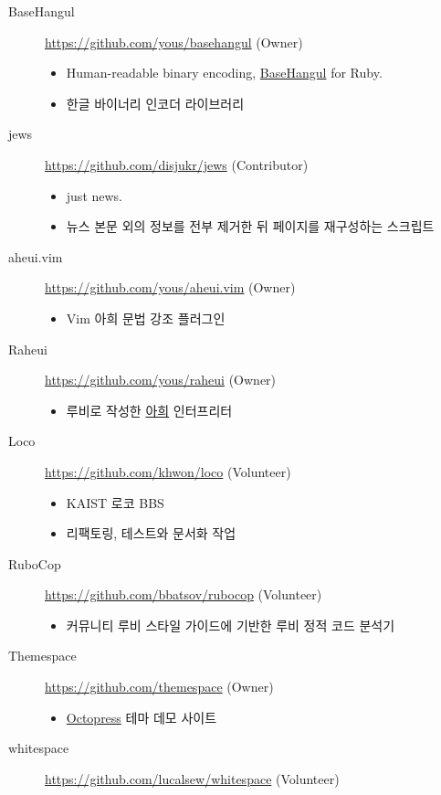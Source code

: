\documentclass[a4paper,10pt]{article}
\begin{document}
\begin{description}
\begin{itemize}
    \end{itemize}
  \item[BaseHangul] \url{https://github.com/yous/basehangul} (Owner)
    \begin{itemize}
      \item Human-readable binary encoding, \href{https://basehangul.github.io}{BaseHangul} for Ruby.
      \item 한글 바이너리 인코더 라이브러리
    \end{itemize}
  \item[jews] \url{https://github.com/disjukr/jews} (Contributor)
    \begin{itemize}
      \item just news.
      \item 뉴스 본문 외의 정보를 전부 제거한 뒤 페이지를 재구성하는 스크립트
    \end{itemize}
  \item[aheui.vim] \url{https://github.com/yous/aheui.vim} (Owner)
    \begin{itemize}
      \item Vim 아희 문법 강조 플러그인
    \end{itemize}
  \item[Raheui] \url{https://github.com/yous/raheui} (Owner)
    \begin{itemize}
      \item 루비로 작성한 \href{http://aheui.github.io}{아희} 인터프리터
    \end{itemize}
  \item[Loco] \url{https://github.com/khwon/loco} (Volunteer)
    \begin{itemize}
      \item KAIST 로코 BBS
      \item 리팩토링, 테스트와 문서화 작업
    \end{itemize}
  \item[RuboCop] \url{https://github.com/bbatsov/rubocop} (Volunteer)
    \begin{itemize}
      \item 커뮤니티 루비 스타일 가이드에 기반한 루비 정적 코드 분석기
    \end{itemize}
  \item[Themespace] \url{https://github.com/themespace} (Owner)
    \begin{itemize}
      \item \href{http://octopress.org}{Octopress} 테마 데모 사이트
    \end{itemize}
  \item[whitespace] \url{https://github.com/lucalsew/whitespace} (Volunteer)

\end{description}
\end{document}
